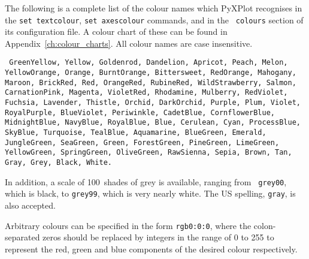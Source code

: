 The following is a complete list of the colour names which PyXPlot recognises
in the {\tt set textcolour}, {\tt set axescolour} commands, and in the {\tt
colours} section of its configuration file.  A colour chart of these can be
found in Appendix~\ref{ch:colour_charts}.  All colour names are case
insensitive.

\vspace{5mm}\noindent
{}
{\tt
GreenYellow, Yellow, Goldenrod, Dandelion, Apricot, Peach, Melon, YellowOrange, Orange, BurntOrange, Bittersweet, RedOrange, Mahogany, Maroon, BrickRed, Red, OrangeRed, RubineRed, WildStrawberry, Salmon, CarnationPink, Magenta, VioletRed, Rhodamine, Mulberry, RedViolet, Fuchsia, Lavender, Thistle, Orchid, DarkOrchid, Purple, Plum, Violet, RoyalPurple, BlueViolet, Periwinkle, CadetBlue, CornflowerBlue, MidnightBlue, NavyBlue, RoyalBlue, Blue, Cerulean, Cyan, ProcessBlue, SkyBlue, Turquoise, TealBlue, Aquamarine, BlueGreen, Emerald, JungleGreen, SeaGreen, Green, ForestGreen, PineGreen, LimeGreen, YellowGreen, SpringGreen, OliveGreen, RawSienna, Sepia, Brown, Tan, Gray, Grey, Black, White.
}

\vspace{5mm}
In addition, a scale of 100~shades of grey is available, ranging from {\tt
grey00}, which is black, to {\tt grey99}, which is very nearly white.  The US
spelling, {\tt gray}, is also accepted.

Arbitrary colours can be specified in the form {\tt rgb0:0:0}, where the
colon-separated zeros should be replaced by integers in the range of 0 to 255
to represent the red, green and blue components of the desired colour
respectively.

